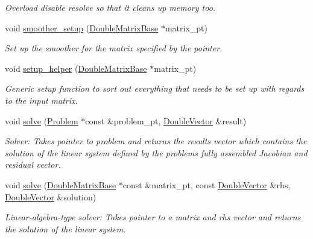\begin{DoxyCompactItemize}
\begin{DoxyCompactList}\small\item\em Overload disable resolve so that it cleans up memory too. \end{DoxyCompactList}\item 
void \hyperlink{classoomph_1_1GS_3_01CRDoubleMatrix_01_4_ab7762326bb595dc015a7504e1b9b996f}{smoother\+\_\+setup} (\hyperlink{classoomph_1_1DoubleMatrixBase}{Double\+Matrix\+Base} $\ast$matrix\+\_\+pt)
\begin{DoxyCompactList}\small\item\em Set up the smoother for the matrix specified by the pointer. \end{DoxyCompactList}\item 
void \hyperlink{classoomph_1_1GS_3_01CRDoubleMatrix_01_4_af18cc36ee80ca8a7323a89f2f1041a9c}{setup\+\_\+helper} (\hyperlink{classoomph_1_1DoubleMatrixBase}{Double\+Matrix\+Base} $\ast$matrix\+\_\+pt)
\begin{DoxyCompactList}\small\item\em Generic setup function to sort out everything that needs to be set up with regards to the input matrix. \end{DoxyCompactList}\item 
void \hyperlink{classoomph_1_1GS_3_01CRDoubleMatrix_01_4_a85164d55db2ab10404d5679657e8f6de}{solve} (\hyperlink{classoomph_1_1Problem}{Problem} $\ast$const \&problem\+\_\+pt, \hyperlink{classoomph_1_1DoubleVector}{Double\+Vector} \&result)
\begin{DoxyCompactList}\small\item\em Solver\+: Takes pointer to problem and returns the results vector which contains the solution of the linear system defined by the problem\textquotesingle{}s fully assembled Jacobian and residual vector. \end{DoxyCompactList}\item 
void \hyperlink{classoomph_1_1GS_3_01CRDoubleMatrix_01_4_a357c56a7521b27814d9ab84a3b1e3a75}{solve} (\hyperlink{classoomph_1_1DoubleMatrixBase}{Double\+Matrix\+Base} $\ast$const \&matrix\+\_\+pt, const \hyperlink{classoomph_1_1DoubleVector}{Double\+Vector} \&rhs, \hyperlink{classoomph_1_1DoubleVector}{Double\+Vector} \&solution)
\begin{DoxyCompactList}\small\item\em Linear-\/algebra-\/type solver\+: Takes pointer to a matrix and rhs vector and returns the solution of the linear system. \end{DoxyCompactList}\item 

\end{DoxyCompactItemize}
